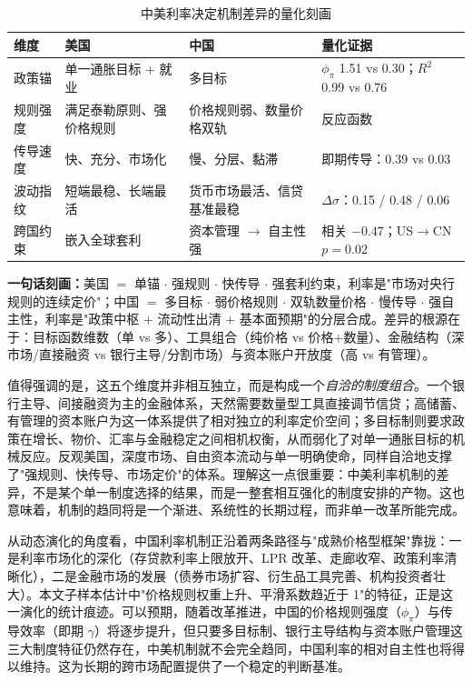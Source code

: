 \documentclass[12pt,a4paper]{ctexart}
\begin{document}
\begin{table}[H]
\centering
\caption{中美利率决定机制差异的量化刻画}
\label{tab:summary}
\small
\begin{tabular}{P{2.3cm} P{4.0cm} P{4.0cm} P{3.0cm}}
\toprule
\textbf{维度} & \textbf{美国} & \textbf{中国} & \textbf{量化证据} \\
\midrule
政策锚 & 单一通胀目标 + 就业 & 多目标 & $\phi_\pi$ 1.51 vs 0.30；$R^2$ 0.99 vs 0.76 \\
规则强度 & 满足泰勒原则、强价格规则 & 价格规则弱、数量价格双轨 & 反应函数 \\
传导速度 & 快、充分、市场化 & 慢、分层、黏滞 & 即期传导：0.39 vs 0.03 \\
波动指纹 & 短端最稳、长端最活 & 货币市场最活、信贷基准最稳 & $\Delta\sigma$：0.15 / 0.48 / 0.06 \\
跨国约束 & 嵌入全球套利 & 资本管理 $\to$ 自主性强 & 相关 $-0.47$；US$\to$CN $p=0.02$ \\
\bottomrule
\end{tabular}
\end{table}

\textbf{一句话刻画：}美国 $=$ 单锚 $\cdot$ 强规则 $\cdot$ 快传导 $\cdot$ 强套利约束，利率是"市场对央行规则的连续定价"；中国 $=$ 多目标 $\cdot$ 弱价格规则 $\cdot$ 双轨数量价格 $\cdot$ 慢传导 $\cdot$ 强自主性，利率是"政策中枢 $+$ 流动性出清 $+$ 基本面预期"的分层合成。差异的根源在于：目标函数维数（单 vs 多）、工具组合（纯价格 vs 价格$+$数量）、金融结构（深市场/直接融资 vs 银行主导/分割市场）与资本账户开放度（高 vs 有管理）。

值得强调的是，这五个维度并非相互独立，而是构成一个\emph{自洽的制度组合}。一个银行主导、间接融资为主的金融体系，天然需要数量型工具直接调节信贷；高储蓄、有管理的资本账户为这一体系提供了相对独立的利率定价空间；多目标制则要求政策在增长、物价、汇率与金融稳定之间相机权衡，从而弱化了对单一通胀目标的机械反应。反观美国，深度市场、自由资本流动与单一明确使命，同样自洽地支撑了"强规则、快传导、市场定价"的体系。理解这一点很重要：中美利率机制的差异，不是某个单一制度选择的结果，而是一整套相互强化的制度安排的产物。这也意味着，机制的趋同将是一个渐进、系统性的长期过程，而非单一改革所能完成。

从动态演化的角度看，中国利率机制正沿着两条路径与"成熟价格型框架"靠拢：一是利率市场化的深化（存贷款利率上限放开、LPR 改革、走廊收窄、政策利率清晰化），二是金融市场的发展（债券市场扩容、衍生品工具完善、机构投资者壮大）。本文子样本估计中"价格规则权重上升、平滑系数趋近于 1"的特征，正是这一演化的统计痕迹。可以预期，随着改革推进，中国的价格规则强度（$\phi_\pi$）与传导效率（即期 $\gamma$）将逐步提升，但只要多目标制、银行主导结构与资本账户管理这三大制度特征仍然存在，中美机制就不会完全趋同，中国利率的相对自主性也将得以维持。这为长期的跨市场配置提供了一个稳定的判断基准。
\end{document}
